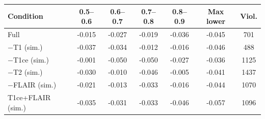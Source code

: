 \begin{tabular}{lcccccc}
\toprule
Condition & 0.5--0.6 & 0.6--0.7 & 0.7--0.8 & 0.8--0.9 & Max lower & Viol. \\
\midrule
Full & -0.015 & -0.027 & -0.019 & -0.036 & -0.045 & 701 \\
$-$T1 (sim.) & -0.037 & -0.034 & -0.012 & -0.016 & -0.046 & 488 \\
$-$T1ce (sim.) & -0.001 & -0.050 & -0.050 & -0.027 & -0.036 & 1125 \\
$-$T2 (sim.) & -0.030 & -0.010 & -0.046 & -0.005 & -0.041 & 1437 \\
$-$FLAIR (sim.) & -0.021 & -0.013 & -0.033 & -0.016 & -0.044 & 1070 \\
T1ce+FLAIR (sim.) & -0.035 & -0.031 & -0.033 & -0.046 & -0.057 & 1096 \\
\bottomrule
\end{tabular}
